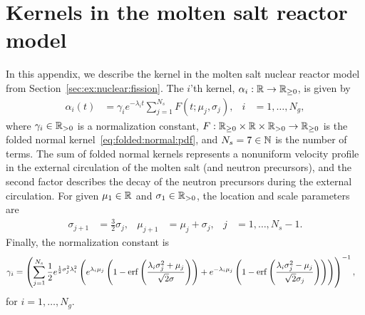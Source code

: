 \section{Kernels in the molten salt reactor model}\label{sec:nuclear:fission:kernel}
In this appendix, we describe the kernel in the molten salt nuclear reactor model from Section~\ref{sec:ex:nuclear:fission}. The $i$'th kernel, $\alpha_i: \mathbb{R} \rightarrow \mathbb{R}_{\geq 0}$, is given by
%
\begin{align}\label{eq:nuclear:fission:kernels}
	\alpha_i(t) &= \gamma_i e^{-\lambda_i t} \sum_{j=1}^{N_s} F(t; \mu_j, \sigma_j), & i &= 1, \ldots, N_g,
\end{align}
%
where $\gamma_i \in \mathbb{R}_{> 0}$ is a normalization constant, $F: \mathbb{R}_{\geq 0} \times \mathbb{R} \times \mathbb{R}_{> 0} \rightarrow \mathbb{R}_{\geq 0}$ is the folded normal kernel~\eqref{eq:folded:normal:pdf}, and $N_s = 7 \in \mathbb{N}$ is the number of terms. The sum of folded normal kernels represents a nonuniform velocity profile in the external circulation of the molten salt (and neutron precursors), and the second factor describes the decay of the neutron precursors during the external circulation. For given $\mu_1 \in \mathbb{R}$ and $\sigma_1 \in \mathbb{R}_{> 0}$, the location and scale parameters are
%
\begin{align}
	\sigma_{j+1} &= \frac{3}{2} \sigma_j, &
	\mu_{j+1} &= \mu_j + \sigma_j, & j &= 1, \ldots, N_s - 1.
\end{align}
%
Finally, the normalization constant is
%
\begin{align}
    \gamma_i &= \left(\sum_{j=1}^{N_s} \frac{1}{2} e^{\frac{1}{2} \sigma_j^2 \lambda_i^2} \left(e^{\lambda_i \mu_j} \left(1 - \operatorname{erf}\left(\frac{\lambda_i \sigma_j^2 + \mu_j}{\sqrt{2} \sigma}\right)\right) + e^{-\lambda_i \mu_j} \left(1 - \operatorname{erf}\left(\frac{\lambda_i \sigma_j^2 - \mu_j}{\sqrt{2} \sigma_j}\right)\right)\right)\right)^{-1},
\end{align}
%
for $i = 1, \ldots, N_g$.
